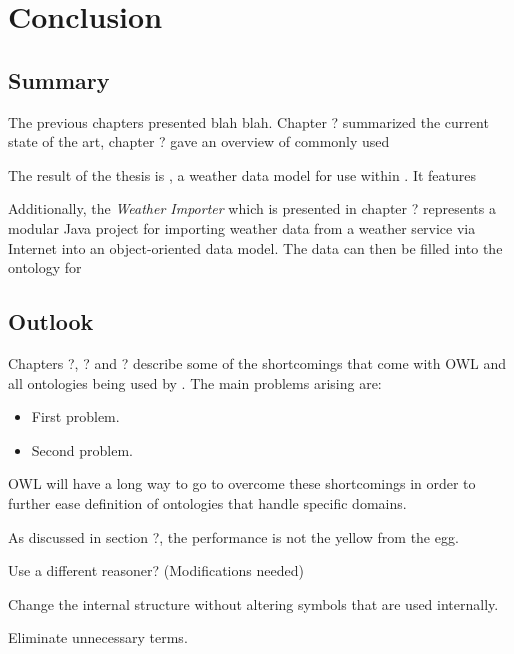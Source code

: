 \chapter{Conclusion}
\label{ch:conclusion}


\section{Summary}


The previous chapters presented blah blah. Chapter ? summarized the current state of the art, chapter ? gave an overview of commonly used 

The result of the thesis is \thinkhomeweather, a weather data model for use within \thinkhome. It features  %

Additionally, the \emph{Weather Importer} which is presented in chapter ? represents a modular Java project for importing weather data from a weather service via Internet into an object-oriented data model. The data can then be filled into the \thinkhomeweather ontology for %


\section{Outlook}

Chapters ?, ? and ? describe some of the shortcomings that come with OWL and all ontologies being used by \thinkhomeweather. The main problems arising are:

\begin{itemize}
  \item First problem.
  \item Second problem.
\end{itemize}

OWL will have a long way to go to overcome these shortcomings in order to further ease definition of ontologies that handle specific domains.


As discussed in section ?, the performance is not the yellow from the egg.

Use a different reasoner? (Modifications needed)

Change the internal structure without altering symbols that are used internally.

Eliminate unnecessary terms.

